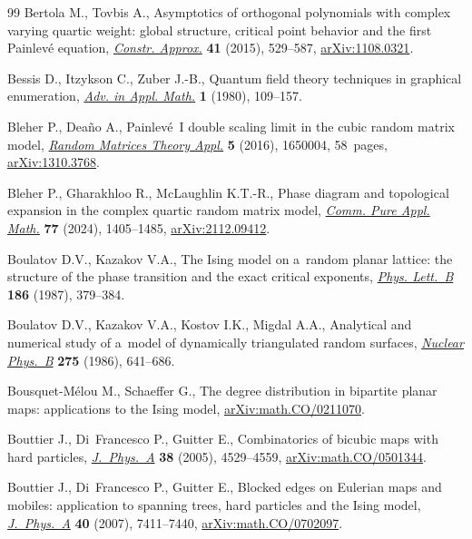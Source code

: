 \documentclass[pdftex]{sigma}
\numberwithin{equation}{section}
\begin{document}
\begin{thebibliography}{99}
Bertola M., Tovbis A., Asymptotics of orthogonal polynomials with complex
 varying quartic weight: global structure, critical point behavior and the
 first {P}ainlev\'e equation,
 \href{https://doi.org/10.1007/s00365-015-9288-0}{\textit{Constr. Approx.}}
 \textbf{41} (2015), 529--587,
 \href{http://arxiv.org/abs/1108.0321}{arXiv:1108.0321}.

Bessis D., Itzykson C., Zuber J.-B., Quantum field theory techniques in
 graphical enumeration,
 \href{https://doi.org/10.1016/0196-8858(80)90008-1}{\textit{Adv. in Appl.
 Math.}} \textbf{1} (1980), 109--157.

Bleher P., Dea\~no A., Painlev\'e~{I} double scaling limit in the cubic random
 matrix model, \href{https://doi.org/10.1142/S2010326316500040}{\textit{Random
 Matrices Theory Appl.}} \textbf{5} (2016), 1650004, 58~pages,
 \href{http://arxiv.org/abs/1310.3768}{arXiv:1310.3768}.

Bleher P., Gharakhloo R., McLaughlin K.T.-R., Phase diagram and topological
 expansion in the complex quartic random matrix model,
 \href{https://doi.org/10.1002/cpa.22164}{\textit{Comm. Pure Appl. Math.}}
 \textbf{77} (2024), 1405--1485,
 \href{http://arxiv.org/abs/2112.09412}{arXiv:2112.09412}.

Boulatov D.V., Kazakov V.A., The {I}sing model on a~random planar lattice: the
 structure of the phase transition and the exact critical exponents,
 \href{https://doi.org/10.1016/0370-2693(87)90312-1}{\textit{Phys. Lett.~B}}
 \textbf{186} (1987), 379--384.

Boulatov D.V., Kazakov V.A., Kostov I.K., Migdal A.A., Analytical and numerical
 study of a~model of dynamically triangulated random surfaces,
 \href{https://doi.org/10.1016/0550-3213(86)90578-X}{\textit{Nuclear Phys.~B}}
 \textbf{275} (1986), 641--686.

Bousquet-M\'elou M., Schaeffer G., The degree distribution in bipartite planar
 maps: applications to the {I}sing model,
 \href{http://arxiv.org/abs/math.CO/0211070}{arXiv:math.CO/0211070}.

Bouttier J., Di~Francesco P., Guitter E., Combinatorics of bicubic maps with
 hard particles,
 \href{https://doi.org/10.1088/0305-4470/38/21/002}{\textit{J.~Phys.~A}}
 \textbf{38} (2005), 4529--4559,
 \href{http://arxiv.org/abs/math.CO/0501344}{arXiv:math.CO/0501344}.

Bouttier J., Di~Francesco P., Guitter E., Blocked edges on {E}ulerian maps and
 mobiles: application to spanning trees, hard particles and the {I}sing model,
 \href{https://doi.org/10.1088/1751-8113/40/27/002}{\textit{J.~Phys.~A}}
 \textbf{40} (2007), 7411--7440,
 \href{http://arxiv.org/abs/math.CO/0702097}{arXiv:math.CO/0702097}.


\end{thebibliography}
\end{document}

